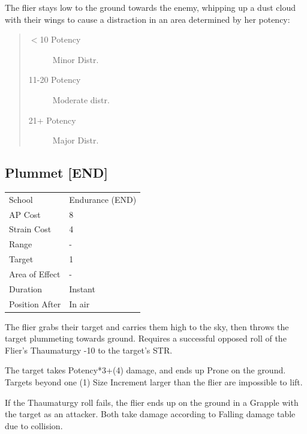 \documentclass[11pt,a4paper,twocolumn]{book}
\begin{document}
\medskip

The flier stays low to the ground towards the enemy, whipping up a dust cloud with their wings to cause a distraction in an area determined by her potency:
\begin{quote}
  \begin{description}
    \item[$<$10 Potency] 	Minor Distr.
    \item[11-20 Potency] 	Moderate distr.
    \item[21+ Potency] 		Major Distr.
  \end{description}
\end{quote}

\vfill


\subsection*{Plummet [END]}
{
	\begin{tabu} to 75mm{| X[l,4] | X[l,7] |}
		\hline
		School 			& Endurance (END) 	\\
        AP Cost	      	& 8					\\
        Strain Cost     & 4 				\\
        Range     		& - 				\\
        Target      	& 1 				\\
        Area of Effect  & - 	 			\\
        Duration     	& Instant 	 		\\
		Position After  & In air 			\\ \hline
	\end{tabu}
		
}

\medskip

The flier grabs their target and carries them high to the sky, then throws the target plummeting towards ground. Requires a successful opposed roll of the Flier's Thaumaturgy -10 to the target's STR.

The target takes Potency*3+(4) damage, and ends up Prone on the ground. Targets beyond one (1) Size Increment larger than the flier are impossible to lift.

If the Thaumaturgy roll fails, the flier ends up on the ground in a Grapple with the target as an attacker. Both take damage according to Falling damage table due to collision.

\vfill
\end{document}
